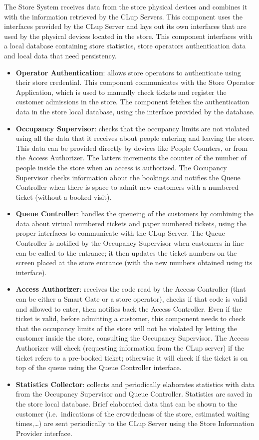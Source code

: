 The Store System receives data from the store physical devices and combines it with the information retrieved by the CLup Servers. This component uses the interfaces provided by the CLup Server and lays out its own interfaces that are used by the physical devices located in the store. This component interfaces with a local database containing store statistics, store operators authentication data and local data that need persistency.

\begin{itemize}
    \item \textbf{Operator Authentication}: allows store operators to authenticate using their store credential. This component communicates with the Store Operator Application, which is used to manually check tickets and register the customer admissions in the store. The component fetches the authentication data in the store local database, using the interface provided by the database.
    \item \textbf{Occupancy Supervisor}: checks that the occupancy limits are not violated using all the data that it receives about people entering and leaving the store. This data can be provided directly by devices like People Counters, or from the Access Authorizer. The latters increments the counter of the number of people inside the store when an access is authorized. The Occupancy Supervisor checks information about the bookings and notifies the Queue Controller when there is space to admit new customers with a numbered ticket (without a booked visit).
    \item \textbf{Queue Controller}: handles the queueing of the customers by combining the data about virtual numbered tickets and paper numbered tickets, using the proper interfaces to communicate with the CLup Server. The Queue Controller is notified by the Occupancy Supervisor when customers in line can be called to the entrance; it then updates the ticket numbers on the screen placed at the store entrance (with the new numbers obtained using its interface).
    \item \textbf{Access Authorizer}: receives the code read by the Access Controller (that can be either a Smart Gate or a store operator), checks if that code is valid and allowed to enter, then notifies back the Access Controller. Even if the ticket is valid, before admitting a customer, this component needs to check that the occupancy limits of the store will not be violated by letting the customer inside the store, consulting the Occupancy Supervisor. The Access Authorizer will check (requesting information from the CLup server) if the ticket refers to a pre-booked ticket; otherwise it will check if the ticket is on top of the queue using the Queue Controller interface.
    \item \textbf{Statistics Collector}: collects and periodically elaborates statistics with data from the Occupancy Supervisor and Queue Controller. Statistics are saved in the store local database. Brief elaborated data that can be shown to the customer (i.e.~indications of the crowdedness of the store, estimated waiting times,\ldots) are sent periodically to the CLup Server using the Store Information Provider interface.
\end{itemize}

